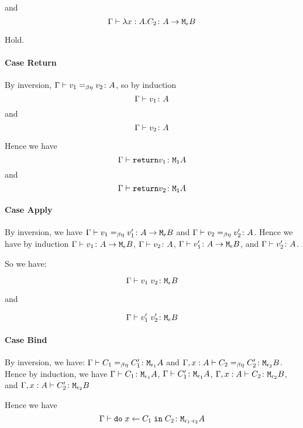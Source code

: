 {        and
        \begin{equation}
            \Gamma \vdash \lambda x : A. C_2 \colon A \rightarrow \texttt{M}_{\epsilon}{B}
        \end{equation}

        Hold.
    \paragraph{Case Return}
        By inversion, $\Gamma \vdash v_1 =_{\beta\eta} v_2 \colon A$, so by induction $$\Gamma \vdash v_1 \colon A$$ and $$\Gamma \vdash v_2 \colon A$$

        Hence we have $$\Gamma \vdash \texttt{return} v_1 \colon \texttt{M}_{\texttt{1}}{A}$$
        and
        $$\Gamma \vdash \texttt{return} v_2 \colon \texttt{M}_{\texttt{1}}{A}$$
    \paragraph{Case Apply}

        By inversion, we have $\Gamma \vdash v_1 =_{\beta\eta} v_1' \colon A \rightarrow \texttt{M}_{\epsilon}{B}$ and $\Gamma \vdash v_2 =_{\beta\eta} v_2' \colon A$. Hence we have by induction $\Gamma \vdash v_1 \colon A \rightarrow \texttt{M}_{\epsilon}{B}$, $\Gamma \vdash v_2 \colon A$, $\Gamma \vdash v_1' \colon A \rightarrow \texttt{M}_{\epsilon}{B}$, and $\Gamma \vdash v_2' \colon A$.

        So we have:

        \begin{equation}
            \Gamma \vdash v_1\; v_2 \colon \texttt{M}_{\epsilon}{B}
        \end{equation}

        and

        
        \begin{equation}
            \Gamma \vdash v_1'\; v_2' \colon \texttt{M}_{\epsilon}{B}
        \end{equation}

    \paragraph{Case Bind}
        By inversion, we have:
        $\Gamma \vdash C_1 =_{\beta\eta} C_1' \colon \texttt{M}_{\epsilon_1}{A}$ and
        $\Gamma, x: A \vdash C_2 =_{\beta\eta} C_2' \colon \texttt{M}_{\epsilon_2}{B}$.
        Hence by induction, we have 
        $\Gamma \vdash C_1 \colon \texttt{M}_{\epsilon_1}{A}$,
        $\Gamma \vdash C_1' \colon \texttt{M}_{\epsilon_1}{A}$,
        $\Gamma, x: A \vdash C_2 \colon \texttt{M}_{\epsilon_2}{B}$, and 
        $\Gamma, x: A \vdash C_2' \colon \texttt{M}_{\epsilon_2}{B}$

        Hence we have 
        \begin{equation}
            \Gamma \vdash \texttt{do}\; x \leftarrow C_1 \;\texttt{in}\; C_2 \colon \texttt{M}_{\epsilon_1\cdot\epsilon_2}{A}
        \end{equation}

}
